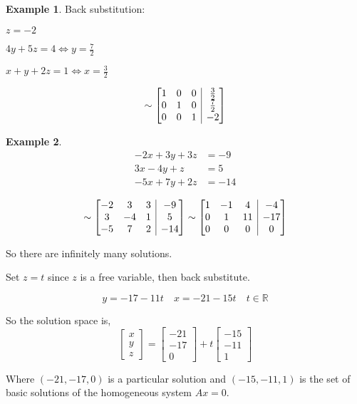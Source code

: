 \documentclass{report}
\makeatletter
\newenvironment{amatrix}[1]{%
  \left[\begin{array}{@{}*{#1}{c}|c@{}}
}{%
  \end{array}\right]
}
\theoremstyle{definition}
\newtheorem{ex}{Example}[section]
\theoremstyle{remark}
\makeatother
\begin{document}
\begin{ex}
Back substitution:

$z=-2$

$4y+5z=4\Leftrightarrow y=\frac{7}{2}$

$x+y+2z=1\Leftrightarrow x=\frac{3}{2}$

\[\sim
\begin{amatrix}{3}
 1 & 0 & 0 & \frac{3}{2} \\
 0 & 1 & 0 & \frac{7}{2} \\
 0 & 0 & 1 & -2
\end{amatrix}
\]
\end{ex}

\begin{ex}
\begin{align*}
-2x+3y+3z&=-9 \\
3x-4y+z&=5 \\
-5x+7y+2z&=-14
\end{align*}

\[\sim
\begin{amatrix}{3}
 -2 & 3 & 3 & -9 \\
 3 & -4 & 1 & 5 \\
 -5 & 7 & 2 & -14
\end{amatrix}\sim
\begin{amatrix}{3}
 1 & -1 & 4 & -4 \\
 0 & 1 & 11 & -17 \\
 0 & 0 & 0 & 0
\end{amatrix}
\]

So there are infinitely many solutions.

Set $z=t$ since $z$ is a free variable, then back substitute.

\[y=-17-11t\quad x=-21-15t\quad t\in \mathbb{R}\]

So the solution space is,
\[\begin{bmatrix}
 x \\
 y \\
 z
\end{bmatrix} =
\begin{bmatrix}
 -21 \\
 -17 \\
 0
\end{bmatrix} +t
\begin{bmatrix}
 -15 \\
 -11 \\
 1
\end{bmatrix}
\]

Where $(-21, -17, 0)$ is a particular solution and $(-15, -11, 1)$ is the set of basic solutions of the homogeneous system $Ax=0$.
\end{ex}
\end{document}
